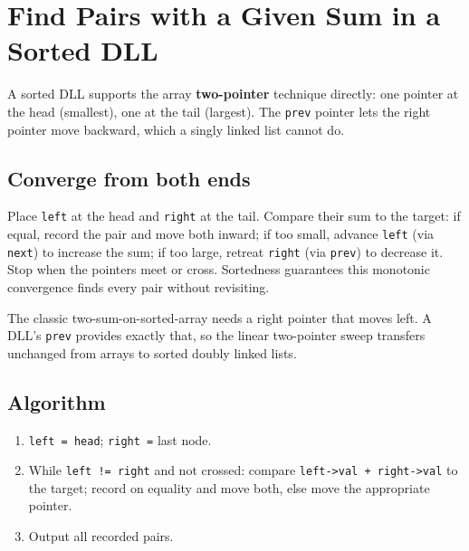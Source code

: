 \section{Find Pairs with a Given Sum in a Sorted DLL}
\label{sec:ll-pairs-sum-dll}


\begin{patternbox}
A sorted DLL supports the array \textbf{two-pointer} technique directly: one
pointer at the head (smallest), one at the tail (largest). The
\texttt{prev} pointer lets the right pointer move backward, which a singly
linked list cannot do.
\end{patternbox}

\subsection*{Converge from both ends}

Place \texttt{left} at the head and \texttt{right} at the tail. Compare
their sum to the target: if equal, record the pair and move both inward; if
too small, advance \texttt{left} (via \texttt{next}) to increase the sum; if
too large, retreat \texttt{right} (via \texttt{prev}) to decrease it. Stop
when the pointers meet or cross. Sortedness guarantees this monotonic
convergence finds every pair without revisiting.

\begin{ideabox}
The classic two-sum-on-sorted-array needs a right pointer that moves left.
A DLL's \texttt{prev} provides exactly that, so the linear two-pointer sweep
transfers unchanged from arrays to sorted doubly linked lists.
\end{ideabox}

\subsection*{Algorithm}

\begin{enumerate}
  \item \texttt{left = head}; \texttt{right =} last node.
  \item While \texttt{left != right} and not crossed: compare
        \texttt{left->val + right->val} to the target; record on equality
        and move both, else move the appropriate pointer.
  \item Output all recorded pairs.
\end{enumerate}

